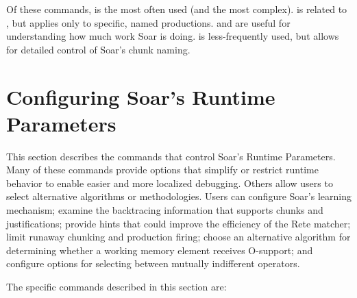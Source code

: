 Of these commands,  is the most often used (and the most 
complex).  is related to , but applies only 
to specific, named productions.  and  
are useful for understanding how much work Soar is doing.  is less-frequently
used, but allows for detailed control of Soar's chunk naming.











\section{Configuring Soar's Runtime Parameters}
\label{RUNTIME}

This section describes the commands that control Soar's Runtime Parameters.
Many of these commands provide options that simplify or restrict 
runtime behavior to enable easier and more localized debugging.
Others allow users to select alternative algorithms or methodologies.
Users can configure Soar's learning mechanism; examine the
backtracing information that supports chunks and justifications;
provide hints that could improve the efficiency of the Rete matcher;
limit runaway chunking and production firing;
choose an alternative algorithm for determining whether a working memory
element receives O-support;  and 
configure options for selecting between mutually indifferent operators.

The specific commands described in this section are:

